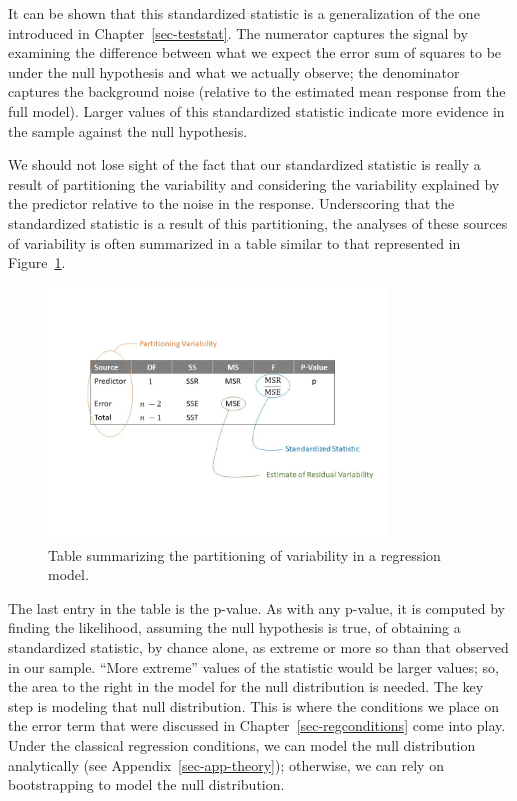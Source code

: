 \documentclass[
  letterpaper,
  DIV=11,
  numbers=noendperiod]{scrreprt}
\theoremstyle{plain}
\theoremstyle{definition}
\theoremstyle{definition}
\theoremstyle{remark}
\begin{document}
It can be shown that this standardized statistic is a generalization of
the one introduced in Chapter~\ref{sec-teststat}. The numerator captures
the signal by examining the difference between what we expect the error
sum of squares to be under the null hypothesis and what we actually
observe; the denominator captures the background noise (relative to the
estimated mean response from the full model). Larger values of this
standardized statistic indicate more evidence in the sample against the
null hypothesis.

We should not lose sight of the fact that our standardized statistic is
really a result of partitioning the variability and considering the
variability explained by the predictor relative to the noise in the
response. Underscoring that the standardized statistic is a result of
this partitioning, the analyses of these sources of variability is often
summarized in a table similar to that represented in
Figure~\ref{fig-regquality-ANOVA-table}.

\begin{figure}

{\centering \includegraphics[width=0.8\textwidth,height=\textheight]{./images/RegQuality-ANOVA-Table.jpg}

}

\caption{\label{fig-regquality-ANOVA-table}Table summarizing the
partitioning of variability in a regression model.}

\end{figure}

The last entry in the table is the p-value. As with any p-value, it is
computed by finding the likelihood, assuming the null hypothesis is
true, of obtaining a standardized statistic, by chance alone, as extreme
or more so than that observed in our sample. ``More extreme'' values of
the statistic would be larger values; so, the area to the right in the
model for the null distribution is needed. The key step is modeling that
null distribution. This is where the conditions we place on the error
term that were discussed in Chapter~\ref{sec-regconditions} come into
play. Under the classical regression conditions, we can model the null
distribution analytically (see Appendix~\ref{sec-app-theory});
otherwise, we can rely on bootstrapping to model the null distribution.
\end{document}

